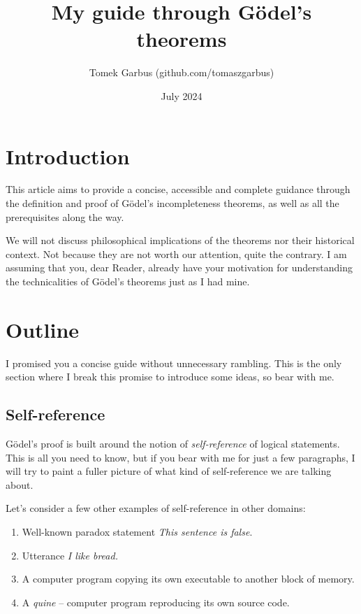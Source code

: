 \documentclass{article}
\title{My guide through Gödel's theorems}
\author{Tomek Garbus (github.com/tomaszgarbus)}
\date{July 2024}
\begin{document}
\maketitle

\section{Introduction}
This article aims to provide a concise, accessible and complete guidance
through the definition and proof of Gödel's incompleteness theorems, as well
as all the prerequisites along the way.

We will not discuss philosophical implications of the theorems nor their
historical context. Not because they are not worth our attention, quite the contrary.
I am assuming that you, dear Reader, already have your motivation for understanding the
technicalities of Gödel's theorems just as I had mine.

\section{Outline}

I promised you a concise guide without unnecessary rambling. This is the only section where
I break this promise to introduce some ideas, so bear with me.

\subsection{Self-reference}

Gödel's proof is built around the notion of \textit{self-reference} of logical statements.
This is all you need to know, but if you bear with me for just a few paragraphs, I will try
to paint a fuller picture of what kind of self-reference we are talking about.

Let's consider a few other examples of self-reference in other domains:

\begin{enumerate}
    \item Well-known paradox statement \textit{This sentence is false}.
    \item Utterance \textit{I like bread.}
    \item A computer program copying its own executable to another block of memory.
    \item A \textit{quine} -- computer program reproducing its own source code.
\end{enumerate}
\end{document}
